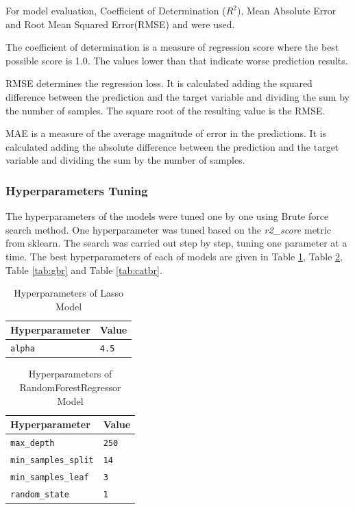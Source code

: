 \documentclass[sigconf, nonacm, natbib, screen, balance=False]{acmart}
\begin{document}
For model evaluation, Coefficient of Determination ($R^2$), Mean Absolute Error and Root Mean Squared Error(RMSE) and were used.

The coefficient of determination is a measure of regression score where the best possible score is 1.0. The values lower than that indicate worse prediction results.

RMSE determines the regression loss. It is calculated adding the squared difference between the prediction and the target variable and dividing the sum by the number of samples. The square root of the resulting value is the RMSE.

MAE is a measure of the average magnitude of error in the predictions. It is calculated adding the absolute difference between the prediction and the target variable and dividing the sum by the number of samples.

\subsubsection{Hyperparameters Tuning}\label{sec:evaul}
The hyperparameters of the models were tuned one by one using Brute force search method. One hyperparameter was tuned based on the \textit{r2\_score} metric from sklearn. The search was carried out step by step, tuning one parameter at a time.  The best hyperparameters of each of models are given in Table \ref{tab:lasso}, Table \ref{tab:rfr}, Table \ref{tab:gbr} and Table \ref{tab:catbr}.

\begin{table}[h!]
      \caption{Hyperparameters of Lasso Model}
  \label{tab:lasso}
  \begin{tabular}{ll}
    \hline
    Hyperparameter & Value \\\hline
    \verb!alpha! & \verb!4.5! \\ \hline
  \end{tabular}
\end{table}

\begin{table}[h!]
      \caption{Hyperparameters of RandomForestRegressor Model}
  \label{tab:rfr}
  \begin{tabular}{ll}
    \hline
    Hyperparameter & Value \\\hline
    \verb!max_depth! & \verb!250! \\
    \verb!min_samples_split! & \verb!14! \\
    \verb!min_samples_leaf! & \verb!3! \\
    \verb!random_state! & \verb!1! \\ \hline
  \end{tabular}
\end{table}
\end{document}
